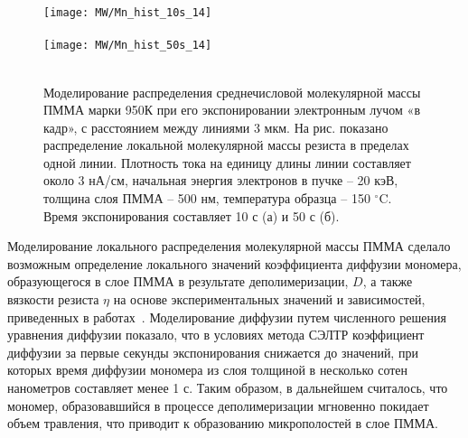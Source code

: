 \begin{figure}[t]
	\begin{center}
		\texttt{[image: MW/Mn\_hist\_10s\_14]} \\
		\vspace{-3.7em}  \vspace{2.7em} \\
		\texttt{[image: MW/Mn\_hist\_50s\_14]} \\
		\vspace{-3.7em}  \vspace{3.7em} \\
	\end{center}
	\vspace{-2.5em}
	\caption{Моделирование распределения среднечисловой молекулярной массы ПММА марки 950К при его экспонировании электронным лучом «в кадр», с расстоянием между линиями 3 мкм. На рис. показано распределение локальной молекулярной массы резиста в пределах одной линии. Плотность тока на единицу длины линии составляет около 3 нА/см, начальная энергия электронов в пучке – 20 кэВ, толщина слоя ПММА -- 500 нм, температура образца -- 150 $^\circ$C. Время экспонирования составляет 10 с (а) и 50 с (б).}
	\label{fig:Mn_hist}
\end{figure}

Моделирование локального распределения молекулярной массы ПММА сделало возможным определение локального значений коэффициента диффузии мономера, образующегося в слое ПММА в результате деполимеризации, $D$, а также вязкости резиста $\eta$ на основе экспериментальных значений и зависимостей, приведенных в работах~\cite{Fragala_3_diffusion, aho2008measurement_WLF, Berens_diffusion_Mn, Leveder_2010, Bueche_3p4_1p4}. Моделирование диффузии путем численного решения уравнения диффузии показало, что в условиях метода СЭЛТР коэффициент диффузии за первые секунды экспонирования снижается до значений, при которых время диффузии мономера из слоя толщиной в несколько сотен нанометров составляет менее 1 с. Таким образом, в дальнейшем считалось, что мономер, образовавшийся в процессе деполимеризации мгновенно покидает объем травления, что приводит к образованию микрополостей в слое ПММА.

